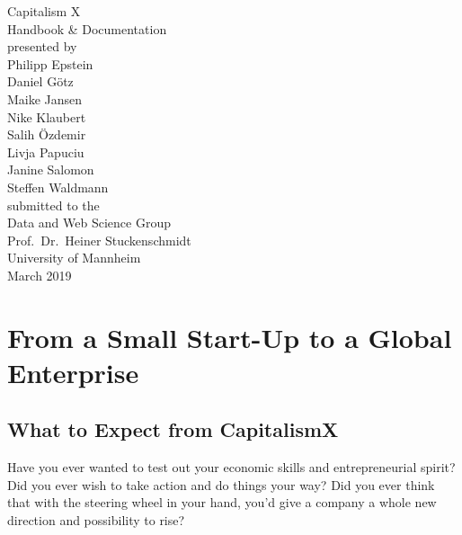 \documentclass[11pt,titlepage,oneside,openany]{book}
\begin{document}
\begin{titlepage}
	\vspace*{2cm}
  \begin{center}
   {\Large Capitalism X\\}
   \vspace{2cm} 
   {Handbook \& Documentation\\}
   \vspace{2cm}
   {presented by\\
   Philipp Epstein \\
    Daniel G\"otz \\
Maike Jansen \\
Nike Klaubert \\
Salih \"Ozdemir \\
Livja Papuciu \\
Janine Salomon \\
Steffen Waldmann \\
   }
   \vspace{1cm} 
   {submitted to the\\
    Data and Web Science Group\\
    Prof.\ Dr.\ Heiner Stuckenschmidt\\
    University of Mannheim\\} \vspace{2cm}
   {March 2019}
  \end{center}
\end{titlepage} 

\tableofcontents
\newpage
\printglossary[style=long]
\listoffigures

\listoftables


\newpage

\chapter{From a Small Start-Up to a Global Enterprise}
\label{cha:intro}
\section{What to Expect from CapitalismX}
Have you ever wanted to test out your economic skills and entrepreneurial spirit? Did you ever wish to take action and do things your way? Did you ever think that with the steering wheel in your hand, you'd give a company a whole new direction and possibility to rise? 
\end{document}
